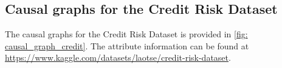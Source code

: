 \documentclass{article} %
\begin{document}




\newpage
\subsection{Causal graphs for the Credit Risk Dataset} \label{Appendix: Causal graphs for Credit Dataset}
The causal graphs for the Credit Risk Dataset is provided in \cref{fig: causal_graph_credit}. The attribute information can be found at \url{https://www.kaggle.com/datasets/laotse/credit-risk-dataset}.
\end{document}
